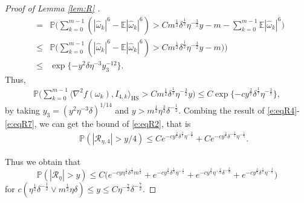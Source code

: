 \documentclass[12pt]{amsart}
\theoremstyle{definition}
\theoremstyle{remark}
\numberwithin{equation}{section}
\newcommand{\E}{\mathbb{E}}            %
\newcommand{\Ll}{\langle}
\newcommand{\Rr}{\rangle}
\newcommand{\PP}{\mathbb{P}}
\begin{document}
\begin{proof}[Proof of Lemma \ref{lem:R} ]
\begin{eqnarray*}
		&=&\PP\big(\sum_{k=0}^{m-1}
		(|\hat\omega_k|^6-\E|\hat\omega_k|^6)>Cm^{\frac12}\delta^{\frac12}\eta^{-\frac32} y-m-\sum_{k=0}^{m-1}\E|\hat\omega_k|^6\big)\\
		&\le&  \PP\big(\sum_{k=0}^{m-1}
		(|\hat\omega_k|^6-\E|\hat\omega_k|^6)>C m^{\frac12}\delta^{\frac12}\eta^{-\frac32} y-m)\big)\\
		&\le& \exp\{-y^2\delta\eta^{-3}y_3^{-12}\}.
	\end{eqnarray*}
	Thus,
	\begin{eqnarray}\label{e:eqR7}
		\PP\big(\sum_{k=0}^{m-1}\Ll \nabla^2f(\omega_k ), 
		I_{4,k}\Rr_\mathrm{HS}>C m^{\frac12}\delta^{\frac12}\eta^{-\frac32} y
		\big)\le C\exp\{-cy^{\frac27}\delta^{\frac17}\eta^{-\frac37}\},
	\end{eqnarray}
	by taking $y_3=(y^2\eta^{-3}\delta)^{1/14}$ and $y>m^{\frac12}\eta^{\frac32}\delta^{-\frac12}$. Combing the result of \eqref{e:eqR4}-\eqref{e:eqR7}, we can get the bound of \eqref{e:eqR2}, that is
	\begin{eqnarray*}
		&&\PP(|\mathcal{R}_{\eta,4}|>y/4)\le	Ce^{-cy^{\frac27}\delta^{\frac17}\eta^{-\frac37}}+Ce^{-cy^{\frac25}\delta^{-\frac15}\eta^{-\frac15}}.
	\end{eqnarray*}

Thus we obtain that
	\begin{equation*}
	\PP(|\mathcal{R}_\eta|>y)\le C\Big( e^{-cy\eta^{\frac12}\delta^\frac12m^{\frac12} }
	+e^{-cy^\frac25\delta^\frac15 \eta^{-\frac1{5}}}
	+e^{-cy^{\frac29}\eta^{-\frac29}\delta^{-\frac29} }
	+e^{-cy^{\frac27}\delta^{\frac17}\eta^{-\frac37}}\Big)
\end{equation*}
for $c(\eta^{\frac12}\delta^{-\frac12}\vee m^{\frac12}\eta\delta)\le y\le C\eta^{-\frac72}\delta^{-\frac72}$.



\end{proof}
\end{document}
